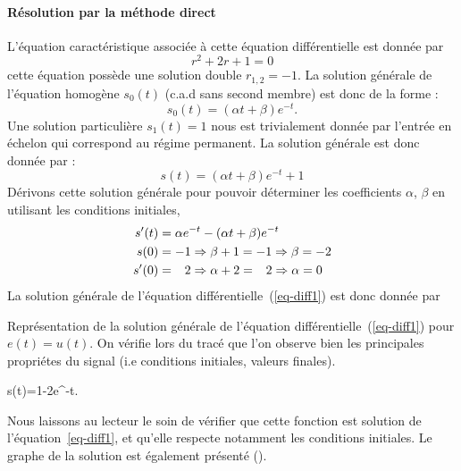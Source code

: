 \paragraph{Résolution par la méthode direct}
L'équation caractéristique associée à cette équation différentielle est 
donnée par 
\[
    r^2+2r+1=0
\]
cette équation possède une solution double $r_{1,2}=-1$.
La solution générale de l'équation homogène $s_0(t)$ (c.a.d sans second membre) 
est donc de la forme :
\[
    s_0(t)=(\alpha t+\beta)e^{-t}.
\]
Une solution particulière $s_1(t)=1$ nous est trivialement donnée par l'entrée 
en échelon qui correspond au régime permanent.
La solution générale est donc donnée par :
\[
    s(t)=(\alpha t+\beta)e^{-t}+1
\]
Dérivons cette solution générale pour pouvoir déterminer les coefficients 
$\alpha$, $\beta$ en utilisant les conditions initiales,
\begin{align*}
    s'(t)&=\alpha e^{-t}-(\alpha t+\beta)e^{-t}\\
     s(0)&=-1\Rightarrow\beta+1=-1\Rightarrow\beta=-2 \\
    s'(0)&=\hphantom{-}2\Rightarrow\alpha+2=\hphantom{-}2\Rightarrow\alpha=0
\end{align*}
La solution générale de l'équation différentielle~(\ref{eq-diff1}) est 
donc donnée par 
\begin{marginfigure}
    \centering
    \resizebox{\linewidth}{!}{}
    \caption{Représentation de la solution générale de l'équation 
             différentielle~(\ref{eq-diff1}) pour $e(t)=u(t)$. 
             On vérifie lors du tracé que l'on observe bien les principales 
             propriétes du signal (i.e conditions initiales, 
             valeurs finales).\label{fig-solution}}
\end{marginfigure}
\begin{bequation}
s(t)=1-2e^{-t}.
\end{bequation}
Nous laissons au lecteur le soin de vérifier que cette fonction est solution 
de l'équation~\ref{eq-diff1}, et qu'elle respecte notamment les conditions 
initiales. Le graphe de la solution est également présenté 
().
